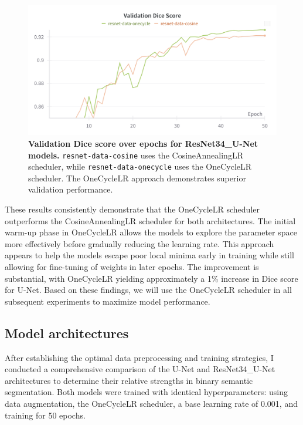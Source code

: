 \documentclass[twocolumn,a4paper]{article}
\begin{document}
\begin{figure}[H]
\centering
\includegraphics[width=0.95\linewidth]{figs/lr_resnet_val_dice}
\caption{\textbf{Validation Dice score over epochs for ResNet34\_U-Net models.} \texttt{resnet-data-cosine} uses the CosineAnnealingLR scheduler, while \texttt{resnet-data-onecycle} uses the OneCycleLR scheduler. The OneCycleLR approach demonstrates superior validation performance.}
\label{fig:lrresnetvaldice}
\end{figure}

These results consistently demonstrate that the OneCycleLR scheduler outperforms the CosineAnnealingLR scheduler for both architectures. The initial warm-up phase in OneCycleLR allows the models to explore the parameter space more effectively before gradually reducing the learning rate. This approach appears to help the models escape poor local minima early in training while still allowing for fine-tuning of weights in later epochs. The improvement is substantial, with OneCycleLR yielding approximately a 1\% increase in Dice score for U-Net. Based on these findings, we will use the OneCycleLR scheduler in all subsequent experiments to maximize model performance.


\subsection{Model architectures}
After establishing the optimal data preprocessing and training strategies, I conducted a comprehensive comparison of the U-Net and ResNet34\_U-Net architectures to determine their relative strengths in binary semantic segmentation. Both models were trained with identical hyperparameters: using data augmentation, the OneCycleLR scheduler, a base learning rate of 0.001, and training for 50 epochs.
\end{document}
